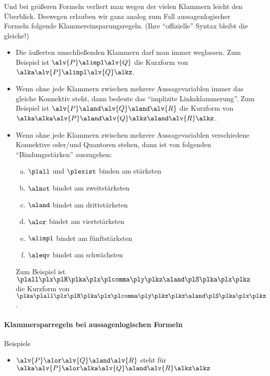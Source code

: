 Und bei größeren Formeln verliert man wegen der vielen Klammern leicht
den Überblick.
%
Deswegen erlauben wir ganz analog zum Fall aussagenlogischer Formeln
folgende Klammereinsparungsregeln.
%
(Ihre "`offizielle"' Syntax bleibt die gleiche!)
%
\begin{itemize}
\item Die äußerten umschließenden Klammern darf man immer weglassen.
  Zum Beispiel ist $\alv{P}\alimpl\alv{Q}$ die Kurzform von
  $\alka\alv{P}\alimpl\alv{Q}\alkz$.
\item Wenn ohne jede Klammern zwischen mehrere Aussagevariablen immer
  das gleiche Konnektiv steht, dann bedeute das "`implizite
  Linksklammerung"'.
  Zum Beispiel ist $\alv{P}\aland\alv{Q}\aland\alv{R}$ die Kurzform von
  $\alka\alka\alv{P}\aland\alv{Q}\alkz\aland\alv{R}\alkz$.
\item Wenn ohne jede Klammern zwischen mehrere Aussagevariablen
  verschiedene Konnektive oder/und Quantoren stehen, dann ist von
  folgenden "`Bindungsstärken"' auszugehen:
  \begin{enumerate}[a)]
  \item $\plall$ und $\plexist$ binden am stärksten
  \item $\alnot$ bindet am zweitstärksten
  \item $\aland$ bindet am drittstärksten
  \item $\alor$ bindet am viertstärksten
  \item $\alimpl$ bindet am fünftstärksten
  \item $\aleqv$ bindet am schwächsten
  \end{enumerate}
  Zum Beispiel ist
  $\plall\plx \plR\plka\plx\plcomma\ply\plkz \aland \plS\plka\plx\plkz$ 
  die Kurzform von
  $\plka\plall\plx \plR\plka\plx\plcomma\ply\plkz\plkz \aland \plS\plka\plx\plkz$.
\end{itemize}
%
\begin{tutorium}
  \paragraph{Klammersparregeln bei aussagenlogischen Formeln}

  Beispiele
  \begin{itemize}
  \item $\alv{P}\alor\alv{Q}\aland\alv{R}$ steht für %
    $\alka \alv{P}\alor \alka\alv{Q}\aland\alv{R}\alkz \alkz$
  \end{itemize}
\end{tutorium}


